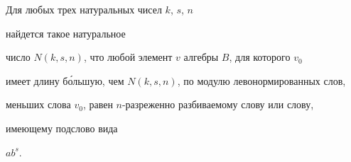 \begin{lem}


Для любых трех натуральных чисел $k$, $s$, $n$


найдется такое натуральное


число $N(k,s,n)$, что любой элемент $v$ алгебры $B$, для которого $v_0$


имеет длину б\'ольшую, чем $N(k,s,n)$, по модулю левонормированных слов,


меньших слова $v_0$, равен $n$-разреженно разбиваемому слову или слову,


имеющему подслово вида


$ab^s$.


\end{lem}





